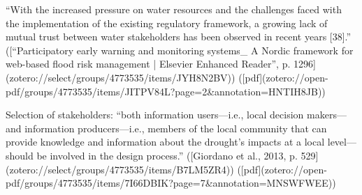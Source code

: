 {{“With the increased pressure on water resources and the challenges faced with the implementation of the existing regulatory framework, a growing lack of mutual trust between water stakeholders has been observed in recent years [38].” ([“Participatory early warning and monitoring systems_ A Nordic framework for web-based flood risk management | Elsevier Enhanced Reader”, p. 1296](zotero://select/groups/4773535/items/JYH8N2BV)) ([pdf](zotero://open-pdf/groups/4773535/items/JITPV84L?page=2&annotation=HNTIH8JB))

Selection of stakeholders:
“both information users—i.e., local decision makers—and information producers—i.e., members of the local community that can provide knowledge and information about the drought’s impacts at a local level—should be involved in the design process.” ([Giordano et al., 2013, p. 529](zotero://select/groups/4773535/items/B7LM5ZR4)) ([pdf](zotero://open-pdf/groups/4773535/items/7I66DBIK?page=7\&annotation=MNSWFWEE))

}}
